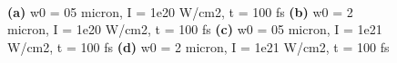 \begin{figure}[h!]
	\centering
	\\
	\caption{\textbf{(a)} w0 = 05 micron, I = 1e20 W/cm2, t = 100 fs \textbf{(b)} w0 = 2 micron, I = 1e20 W/cm2, t = 100 fs \textbf{(c)} w0 = 05 micron, I = 1e21 W/cm2, t = 100 fs \textbf{(d)} w0 = 2 micron, I = 1e21 W/cm2, t = 100 fs}
	\label{}
\end{figure}

